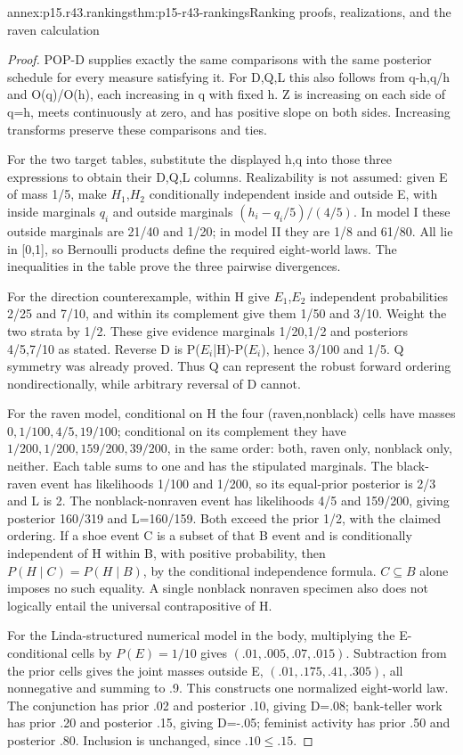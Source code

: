 \begin{annexitem}{annex:p15.r43.rankings}{thm:p15-r43-rankings}{Ranking proofs, realizations, and the raven calculation}
\begin{proof}
POP-D supplies exactly the same comparisons with the same posterior
schedule for every measure satisfying it. For D,Q,L this also follows
from q-h,q/h and O(q)/O(h), each increasing in q with fixed h.
Z is increasing on each side of q=h, meets continuously at zero,
and has positive slope on both sides. Increasing transforms preserve
these comparisons and ties.

For the two target tables, substitute the displayed h,q into those
three expressions to obtain their D,Q,L columns. Realizability is not
assumed: given E of mass 1/5, make \(H_1\),\(H_2\) conditionally independent
inside and outside E, with inside marginals \(q_i\) and outside marginals
\((h_i-q_i/5)/(4/5)\). In model I these outside marginals are
21/40 and 1/20; in model II they are 1/8 and 61/80. All lie in
[0,1], so Bernoulli products define the required eight-world laws.
The inequalities in the table prove the three pairwise divergences.

For the direction counterexample, within H give \(E_1\),\(E_2\) independent
probabilities 2/25 and 7/10, and within its complement give them
1/50 and 3/10. Weight the two strata by 1/2. These give evidence
marginals 1/20,1/2 and posteriors 4/5,7/10 as stated.
Reverse D is P(\(E_i\)|H)-P(\(E_i\)), hence 3/100 and 1/5.
Q symmetry was already proved. Thus Q can represent the robust
forward ordering nondirectionally, while arbitrary reversal of D cannot.

For the raven model, conditional on H the four (raven,nonblack)
cells have masses \(0,1/100,4/5,19/100\); conditional on its
complement they have \(1/200,1/200,159/200,39/200\), in the same
order: both, raven only, nonblack only, neither. Each table sums to
one and has the stipulated marginals. The black-raven event has
likelihoods 1/100 and 1/200, so its equal-prior posterior is 2/3
and L is 2. The nonblack-nonraven event has likelihoods 4/5 and
159/200, giving posterior 160/319 and L=160/159. Both exceed
the prior 1/2, with the claimed ordering.
If a shoe event C is a subset of that B event and is conditionally
independent of H within B, with positive probability, then
\(P(H\mid C)=P(H\mid B)\), by the conditional independence formula. \(C\subseteq B\)
alone imposes no such equality. A single nonblack nonraven specimen
also does not logically entail the universal contrapositive of H.

For the Linda-structured numerical model in the body, multiplying
the E-conditional cells by \(P(E)=1/10\) gives
\((.01,.005,.07,.015)\). Subtraction from the prior cells gives
the joint masses outside E, \((.01,.175,.41,.305)\), all nonnegative
and summing to .9. This constructs one normalized eight-world law.
The conjunction has prior .02 and posterior .10, giving D=.08;
bank-teller work has prior .20 and posterior .15, giving D=-.05;
feminist activity has prior .50 and posterior .80. Inclusion is
unchanged, since \(.10\leq.15\).
\end{proof}
\end{annexitem}


